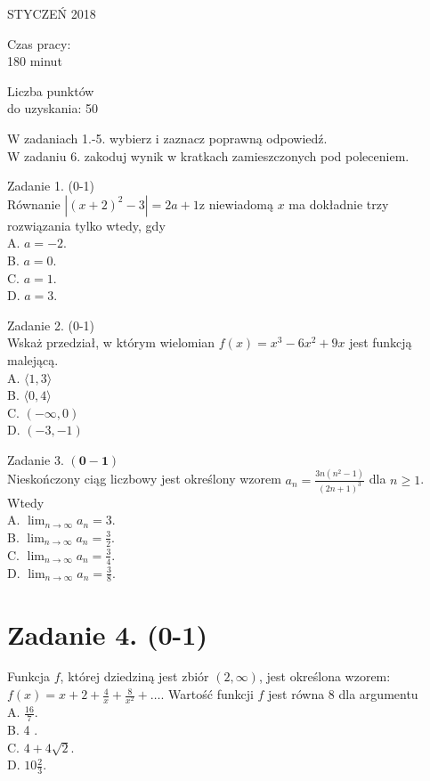 \documentclass[10pt]{article}
\begin{document}
STYCZEŃ 2018

Czas pracy:\\
180 minut

Liczba punktów\\
do uzyskania: 50

W zadaniach 1.-5. wybierz i zaznacz poprawną odpowiedź.\\
W zadaniu 6. zakoduj wynik w kratkach zamieszczonych pod poleceniem.

Zadanie 1. (0-1)\\
Równanie \(\left|(x+2)^{2}-3\right|=2 a+1 \mathrm{z}\) niewiadomą \(x\) ma dokładnie trzy rozwiązania tylko wtedy, gdy\\
A. \(a=-2\).\\
B. \(a=0\).\\
C. \(a=1\).\\
D. \(a=3\).

Zadanie 2. (0-1)\\
Wskaż przedział, w którym wielomian \(f(x)=x^{3}-6 x^{2}+9 x\) jest funkcją malejącą.\\
A. \(\langle 1,3\rangle\)\\
B. \(\langle 0,4\rangle\)\\
C. \((-\infty, 0)\)\\
D. \((-3,-1)\)

Zadanie 3. \(\mathbf{( 0 - 1 )}\)\\
Nieskończony ciąg liczbowy jest określony wzorem \(a_{n}=\frac{3 n\left(n^{2}-1\right)}{(2 n+1)^{3}}\) dla \(n \geqslant 1\). Wtedy\\
A. \(\lim _{n \rightarrow \infty} a_{n}=3\).\\
B. \(\lim _{n \rightarrow \infty} a_{n}=\frac{3}{2}\).\\
C. \(\lim _{n \rightarrow \infty} a_{n}=\frac{3}{4}\).\\
D. \(\lim _{n \rightarrow \infty} a_{n}=\frac{3}{8}\).

\section*{Zadanie 4. (0-1)}
Funkcja \(f\), której dziedziną jest zbiór \((2, \infty)\), jest określona wzorem: \(f(x)=x+2+\frac{4}{x}+\frac{8}{x^{2}}+\ldots\). Wartość funkcji \(f\) jest równa 8 dla argumentu\\
A. \(\frac{16}{7}\).\\
B. 4 .\\
C. \(4+4 \sqrt{2}\).\\
D. \(10 \frac{2}{3}\).
\end{document}
